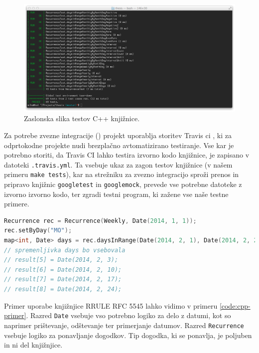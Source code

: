 \begin{figure}
 \includegraphics[width=\linewidth]{cpp-tests}
 \caption{Zaslonska slika testov C++ knjižnice.}
 \label{fig:cpp-tests}
\end{figure}

Za potrebe zvezne integracije () projekt uporablja storitev Travis \gls{ci} \cite{travisci}, ki za odprtokodne projekte nudi brezplačno avtomatizirano testiranje. Vse kar je potrebno storiti, da Travis CI lahko testira izvorno kodo knjižnice, je zapisano v datoteki \texttt{.travis.yml}. Ta vsebuje ukaz za zagon testov knjižnice (v našem primeru \texttt{make tests}), kar na strežniku za zvezno integracijo sproži prenos in pripravo knjižnic \texttt{googletest} in \texttt{googlemock}, prevede vse potrebne datoteke z izvorno izvorno kodo, ter zgradi testni program, ki zažene vse naše testne primere.

\begin{lstlisting}[caption={Primer uporabe C++ knjižnjice RRULE standarda RFC 5545. Izbrani dogodek bi se s tem pravilom ponavljal tedensko, vsak ponedeljek, od 1. januarja 2014 naprej.}, label=code:cpp-primer, language=C++]
Recurrence rec = Recurrence(Weekly, Date(2014, 1, 1));
rec.setByDay("MO");
map<int, Date> days = rec.daysInRange(Date(2014, 2, 1), Date(2014, 2, 28));
// spremenljivka days bo vsebovala
// result[5] = Date(2014, 2, 3);
// result[6] = Date(2014, 2, 10);
// result[7] = Date(2014, 2, 17);
// result[8] = Date(2014, 2, 24);
\end{lstlisting}

Primer uporabe knjižnjice RRULE RFC 5545 lahko vidimo v primeru \ref{code:cpp-primer}. Razred \texttt{Date} vsebuje vso potrebno logiko za delo z datumi, kot so naprimer prištevanje, odštevanje ter primerjanje datumov. Razred \texttt{Recurrence} vsebuje logiko za ponavljanje dogodkov. Tip dogodka, ki se ponavlja, je poljuben in ni del knjižnjice.

